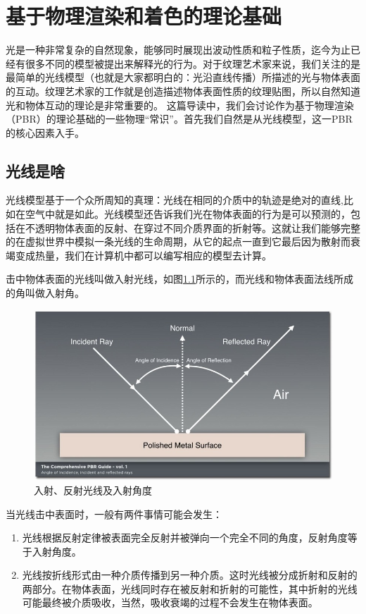 \chapter{基于物理渲染和着色的理论基础}

光是一种非常复杂的自然现象，能够同时展现出波动性质和粒子性质，迄今为止已经有很多不同的模型被提出来解释光的行为。对于纹理艺术家来说，我们关注的是最简单的光线模型（也就是大家都明白的：光沿直线传播）所描述的光与物体表面的互动。纹理艺术家的工作就是创造描述物体表面性质的纹理贴图，所以自然知道光和物体互动的理论是非常重要的。
这篇导读中，我们会讨论作为基于物理渲染（PBR）的理论基础的一些物理“常识”。首先我们自然是从光线模型，这一PBR的核心因素入手。

\section{光线是啥}

光线模型基于一个众所周知的真理：光线在相同的介质中的轨迹是绝对的直线,比如在空气中就是如此。光线模型还告诉我们光在物体表面的行为是可以预测的，包括在不透明物体表面的反射、在穿过不同介质界面的折射等。这就让我们能够完整的在虚拟世界中模拟一条光线的生命周期，从它的起点一直到它最后因为散射而衰竭变成热量，我们在计算机中都可以编写相应的模型去计算。

击中物体表面的光线叫做入射光线，如图\ref{fig:chap1_1}所示的，而光线和物体表面法线所成的角叫做入射角。

\begin{figure}[ht]
    \centering
	\includegraphics[width=\textwidth]{images/chap1_1.jpg}
	\caption{入射、反射光线及入射角度}
    \label{fig:chap1_1}
\end{figure}

当光线击中表面时，一般有两件事情可能会发生：

\begin{enumerate}
\item 光线根据反射定律被表面完全反射并被弹向一个完全不同的角度，反射角度等于入射角度。
\item 光线按折线形式由一种介质传播到另一种介质。这时光线被分成折射和反射的两部分。在物体表面，光线同时存在被反射和折射的可能性，其中折射的光线可能最终被介质吸收，当然，吸收衰竭的过程不会发生在物体表面。
\end{enumerate}

